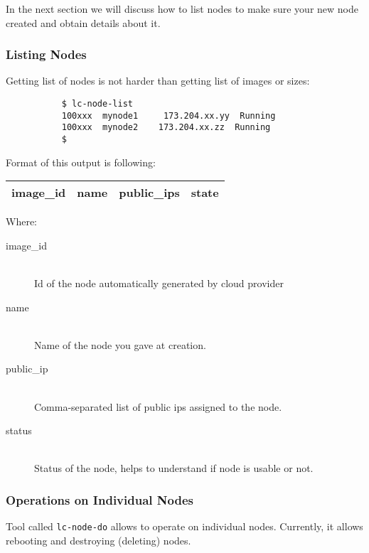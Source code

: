 \documentclass[a4paper]{report}
\begin{document}
	       In the next section we will discuss how to list nodes to make
	       sure your new node created and obtain details about it.

	       \subsubsection{Listing Nodes}
	       Getting list of nodes is not harder than getting list of images
	       or sizes:

	       \begin{verbatim}
	       $ lc-node-list
	       100xxx  mynode1     173.204.xx.yy  Running
	       100xxx  mynode2    173.204.xx.zz  Running
	       $
	       \end{verbatim}

	       Format of this output is following:

	       \begin{center}
		 \begin{tabular}{ | c | c | c | c | }
		   \hline
		     image\_id & name & public\_ips & state \\
		   \hline
		 \end{tabular}
	       \end{center}

	       Where:

	       \begin{description}
		  \item[image\_id] \hfill \\
		  Id of the node automatically generated by cloud provider
		  \item[name] \hfill \\
		  Name of the node you gave at creation.
		  \item[public\_ip] \hfill \\
		  Comma-separated list of public ips assigned to the node.
		  \item[status] \hfill \\
		  Status of the node, helps to understand if node is usable or not.
	       \end{description}

	       \subsubsection{Operations on Individual Nodes}
	       Tool called \texttt{lc-node-do} allows to operate on individual nodes.
	       Currently, it allows rebooting and destroying (deleting) nodes.
\end{document}
